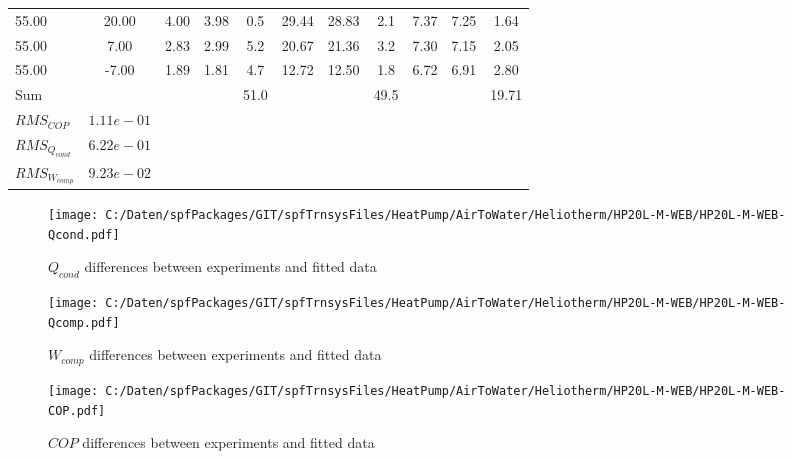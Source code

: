 \documentclass[english]{SPFShortReport}
\begin{document}
\begin{table}[!ht]
\begin{small}
\begin{center}
{\begin{tabular}{l | c c c c c c c c c c }
55.00  & 20.00 & 4.00 & 3.98 & 0.5 & 29.44 & 28.83 & 2.1 & 7.37 & 7.25 & 1.64\\ 
55.00  & 7.00 & 2.83 & 2.99 & 5.2 & 20.67 & 21.36 & 3.2 & 7.30 & 7.15 & 2.05\\ 
55.00  & -7.00 & 1.89 & 1.81 & 4.7 & 12.72 & 12.50 & 1.8 & 6.72 & 6.91 & 2.80\\ 
\hline 
 Sum &  & &  & 51.0 &  &  & 49.5 & &  & 19.71\\ 
\hline 
 $RMS_{COP}$ & $1.11e-01$ \\ 
 $RMS_{Q_{cond}}$ & $6.22e-01$ \\ 
 $RMS_{W_{comp}}$ & $9.23e-02$ \\ 
\hline
\hline
\end{tabular}
}
\label{ErrorsTable}
\end{center}
\end{small}
\end{table}
\begin{figure}[!ht]
\begin{center}
\texttt{[image: C:/Daten/spfPackages/GIT/spfTrnsysFiles/HeatPump/AirToWater/Heliotherm/HP20L-M-WEB/HP20L-M-WEB-Qcond.pdf]}
\caption{$Q_{cond}$ differences between experiments and fitted data}
\label{QcongFig}
\end{center}
\end{figure}
\begin{figure}[!ht]
\begin{center}
\texttt{[image: C:/Daten/spfPackages/GIT/spfTrnsysFiles/HeatPump/AirToWater/Heliotherm/HP20L-M-WEB/HP20L-M-WEB-Qcomp.pdf]}
\caption{$W_{comp}$ differences between experiments and fitted data}
\label{QcompFig}
\end{center}
\end{figure}
\begin{figure}[!ht]
\begin{center}
\texttt{[image: C:/Daten/spfPackages/GIT/spfTrnsysFiles/HeatPump/AirToWater/Heliotherm/HP20L-M-WEB/HP20L-M-WEB-COP.pdf]}
\caption{$COP$ differences between experiments and fitted data}
\label{COPFig}
\end{center}
\end{figure}
\end{document}

